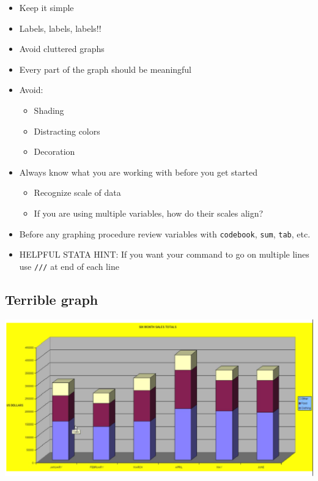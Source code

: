 \documentclass[
]{book}
\providecommand{\tightlist}{%
  \setlength{\itemsep}{0pt}\setlength{\parskip}{0pt}}
\begin{document}
\begin{itemize}
\tightlist
\item
  Keep it simple
\item
  Labels, labels, labels!!
\item
  Avoid cluttered graphs
\item
  Every part of the graph should be meaningful
\item
  Avoid:

  \begin{itemize}
  \tightlist
  \item
    Shading
  \item
    Distracting colors
  \item
    Decoration
  \end{itemize}
\item
  Always know what you are working with before you get started

  \begin{itemize}
  \tightlist
  \item
    Recognize scale of data
  \item
    If you are using multiple variables, how do their scales align?
  \end{itemize}
\item
  Before any graphing procedure review variables with \texttt{codebook}, \texttt{sum}, \texttt{tab}, etc.
\item
  HELPFUL STATA HINT: If you want your command to go on multiple lines use \texttt{///} at end of each line
\end{itemize}

\hypertarget{terrible-graph}{%
\subsection{Terrible graph}\label{terrible-graph}}

\includegraphics{Stata/StataGraph/images/Terrible.png}
\end{document}
